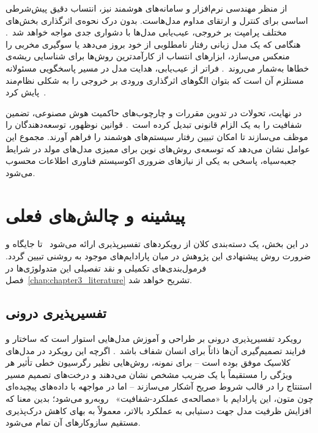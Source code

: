 از منظر مهندسی نرم‌افزار و سامانه‌های هوشمند نیز، انتساب دقیق پیش‌شرطی اساسی برای کنترل و ارتقای مداوم مدل‌هاست. بدون درک نحوه‌ی اثرگذاری بخش‌های مختلف پرامپت بر خروجی، عیب‌یابی مدل‌ها با دشواری جدی مواجه خواهد شد~\cite{shbita2026systematic}. هنگامی که یک مدل زبانی رفتار نامطلوبی از خود بروز می‌دهد یا سوگیری مخربی را منعکس می‌سازد، ابزارهای انتساب از کارآمدترین روش‌ها برای شناسایی ریشه‌ی خطاها به‌شمار می‌روند~\cite{ijcai2024detecting}. فراتر از عیب‌یابی، هدایت مدل در مسیر پاسخگویی مسئولانه مستلزم آن است که بتوان الگوهای اثرگذاری ورودی بر خروجی را به شکلی نظام‌مند پایش کرد~\cite{lochab2025energybased, sharma2024acritical}.

در نهایت، تحولات در تدوین مقررات و چارچوب‌های حاکمیت هوش مصنوعی، تضمین شفافیت را به یک الزام قانونی تبدیل کرده است~\cite{kaminski2019right, papadimitriou2023right}. قوانین نوظهور، توسعه‌دهندگان را موظف می‌سازند تا امکان تبیین رفتار سیستم‌های هوشمند را فراهم آورند. مجموع این عوامل نشان می‌دهد که توسعه‌ی روش‌های نوین برای ممیزی مدل‌های مولد در شرایط جعبه‌سیاه، پاسخی به یکی از نیازهای ضروری اکوسیستم فناوری اطلاعات محسوب می‌شود.


\section{پیشینه و چالش‌های فعلی}\label{sec:1-3}

در این بخش، یک دسته‌بندی کلان از رویکردهای تفسیرپذیری ارائه می‌شود~\cite{guidotti2018survey, danilevsky2020survey} تا جایگاه و ضرورت روش پیشنهادی این پژوهش در میان پارادایم‌های موجود به روشنی تبیین گردد. فرمول‌بندی‌های تکمیلی و نقد تفصیلی این متدولوژی‌ها در فصل~\ref{chap:chapter3_literature} تشریح خواهد شد.

\subsection{تفسیرپذیری درونی}\label{sec:1-3-1}

رویکرد تفسیرپذیری درونی بر طراحی و آموزش مدل‌هایی استوار است که ساختار و فرایند تصمیم‌گیری آن‌ها ذاتاً برای انسان شفاف باشد~\cite{danilevsky2020survey}. اگرچه این رویکرد در مدل‌های کلاسیک موفق بوده است – برای نمونه، روش‌هایی نظیر رگرسیون خطی تأثیر هر ویژگی را مستقیماً با یک ضریب مشخص نشان می‌دهند و درخت‌های تصمیم مسیر استنتاج را در قالب شروط صریح آشکار می‌سازند – اما در مواجهه با داده‌های پیچیده‌ای چون متون، این پارادایم با «مصالحه‌ی عملکرد-شفافیت»~\cite{doshivelez2017rigorous} روبه‌رو می‌شود؛ بدین معنا که افزایش ظرفیت مدل جهت دستیابی به عملکرد بالاتر، معمولاً به بهای کاهش درک‌پذیری مستقیم سازوکارهای آن تمام می‌شود.

